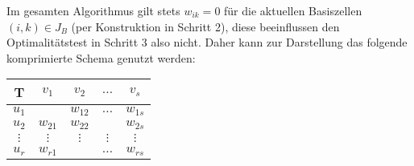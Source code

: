 Im gesamten Algorithmus gilt stets $w_{ik} = 0$ für die aktuellen Basiszellen $(i,k) \in J_B$ (per Konstruktion in Schritt 2), diese beeinflussen den Optimalitätstest in Schritt 3 also nicht. Daher kann zur Darstellung das folgende komprimierte Schema genutzt werden:

\begin{center}
	\begin{tabular}{c|cccc}
		T & $v_1$ & $v_2$ & $\dots$ & $v_s$ \\ \hline
		$u_1$ & \fbox{$x_{11}$} & $w_{12}$  & $\dots$ & $w_{1s}$ \\
		$u_2$ & $w_{21}$ & $w_{22}$ & \fbox{$x_{23}$} & $w_{2s}$ \\
		$\vdots$ &  $\vdots$ & $\vdots$ & $\vdots$ & $\vdots$ \\
		$u_r$ & $w_{r1}$ & \fbox{$x_{r2}$} & $\dots$ & $w_{rs}$ 
	\end{tabular}
\end{center}



